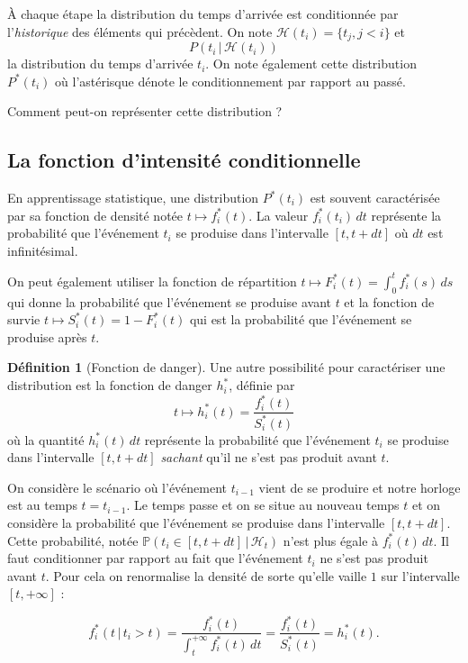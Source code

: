 \documentclass{article}
\theoremstyle{definition}
\newtheorem{defn}{Définition}[section]
\theoremstyle{remark}
\begin{document}
À chaque étape la distribution du temps d'arrivée est conditionnée par
l'\emph{historique} des éléments qui précèdent.
On note $\mathcal{H}(t_i) = \{t_j, j < i\}$ et
$$P(t_i\, |\, \mathcal{H}(t_i))$$
la distribution du temps d'arrivée $t_i$. On note également cette
distribution $P^*(t_i)$ où l'astérisque dénote le conditionnement par
rapport au passé.

Comment peut-on représenter cette distribution ?

\subsection{La fonction d'intensité conditionnelle}

En apprentissage statistique, une distribution $P^* (t_i)$ 
est souvent caractérisée par sa fonction de densité notée
$t \mapsto f^*_i(t)$. La valeur $f^*_i(t_i)\, dt$ représente la
probabilité que l'événement $t_i$ se produise dans l'intervalle $[t, t + dt]$
où $dt$ est infinitésimal.

On peut également utiliser la fonction de répartition
$t \mapsto F^*_i(t) = \int_0^t f^*_i(s)\, ds$ qui donne la probabilité
que l'événement se produise avant $t$ et la fonction de survie
$t \mapsto S^*_i(t) = 1 - F^*_i(t)$ qui est la probabilité que l'événement
se produise après $t$.

\begin{defn}[Fonction de danger]
Une autre possibilité pour caractériser une distribution
est la fonction de danger $h^*_i$, définie par
$$t \mapsto h^*_i(t) = \frac{f^*_i(t)}{S^*_i(t)}$$
où la quantité $h^*_i(t)\, dt$ représente
la probabilité que l'événement $t_i$ se produise dans l'intervalle
$[t, t + dt]$ \emph{sachant} qu'il ne s'est pas produit avant $t$.
\end{defn}

On considère le scénario où l'événement $t_{i-1}$ vient de se produire et
notre horloge est au temps $t = t_{i-1}$. Le temps passe et on se situe
au nouveau temps $t$ et on considère la probabilité que l'événement se
produise dans l'intervalle $[t, t + dt]$. Cette probabilité, notée
$\mathbb{P}(t_i \in [t, t + dt] \, |\,  \mathcal{H}_t)$ n'est plus égale
à $f^*_i(t)\, dt$. Il faut conditionner par rapport au fait que l'événement
$t_i$ ne s'est pas produit avant $t$. Pour cela on renormalise la densité
de sorte qu'elle vaille $1$ sur l'intervalle $[t, +\infty]$ :

$$f^*_i(t\, |\, t_i > t) = \frac{f^*_i(t)}{\int_t^{+\infty}f^*_i(t)\, dt}
= \frac{f^*_i(t)}{S^*_i(t)} = h^*_i(t).$$
\end{document}
